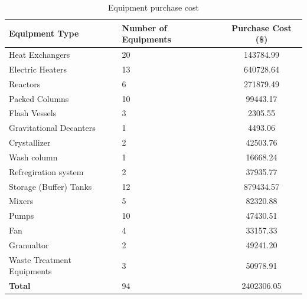 \begin{table}[H]
\centering
\caption{Equipment purchase cost}
\label{tab:equipment purchase}
\begin{tabular}{llS[table-format=7.2,round-mode=figures,round-precision=3]}
\toprule
\textbf{Equipment Type}    & \textbf{Number of Equipments} & \textbf{Purchase Cost (\$)} \\\midrule
Heat Exchangers            & 20                            & 143784.99                  \\
Electric Heaters           & 13                            & 640728.64                  \\
Reactors                   & 6                             & 271879.49                  \\
Packed Columns             & 10                            & 99443.17                   \\
Flash Vessels              & 3                             & 2305.55                    \\
Gravitational Decanters    & 1                             & 4493.06                    \\
Crystallizer               & 2                             & 42503.76                   \\
Wash column                & 1                             & 16668.24                   \\
Refregiration system       & 2                             & 37935.77                   \\
Storage (Buffer) Tanks     & 12                            & 879434.57                  \\
Mixers                     & 5                             & 82320.88                   \\
Pumps                      & 10                            & 47430.51                   \\
Fan                        & 4                             & 33157.33                   \\
Granualtor                 & 2                             & 49241.20                   \\
Waste Treatment Equipments & 3                             & 50978.91                   \\ \midrule
\textbf{Total}             & 94                            & 2402306.05                 \\ \bottomrule
\end{tabular}
\end{table}

